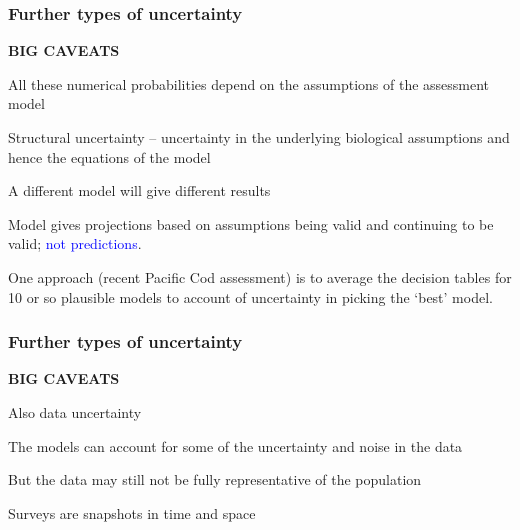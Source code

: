 
\begin{frame}
\frametitle{Further types of uncertainty}

\bc
  {\Huge \bf \alert{BIG CAVEATS}}
\ec

\bi
\item All these numerical probabilities depend on the \alert{assumptions of the
    assessment model}
\item \alert{Structural uncertainty} -- uncertainty in the underlying biological assumptions
  and hence the equations of the model
\pause
\item A different model will give different results
\item Model gives \alert{projections} based on assumptions being valid and
  continuing to be valid; \textcolor{blue}{not predictions}.

\item One approach (recent Pacific Cod assessment) is to average the decision
  tables for 10 or so plausible models to account of uncertainty in picking the
  \alert{`best'} model.
\ei

\end{frame}


\begin{frame}
\frametitle{Further types of uncertainty}

\bc
  {\Huge \bf \alert{BIG CAVEATS}}
\ec

\bi
\item Also \alert{data uncertainty}
\item The models can account for some of the uncertainty and noise in the data
\item But the data may still not be fully representative of the population
\item Surveys are snapshots in time and space
\ei

\end{frame}



